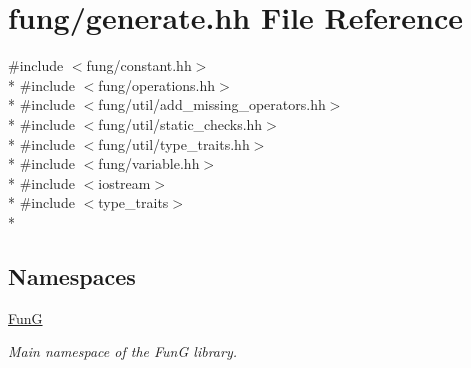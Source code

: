 \hypertarget{generate_8hh}{\section{fung/generate.hh File Reference}
\label{generate_8hh}
}
{\ttfamily \#include $<$fung/constant.\-hh$>$}\\*
{\ttfamily \#include $<$fung/operations.\-hh$>$}\\*
{\ttfamily \#include $<$fung/util/add\-\_\-missing\-\_\-operators.\-hh$>$}\\*
{\ttfamily \#include $<$fung/util/static\-\_\-checks.\-hh$>$}\\*
{\ttfamily \#include $<$fung/util/type\-\_\-traits.\-hh$>$}\\*
{\ttfamily \#include $<$fung/variable.\-hh$>$}\\*
{\ttfamily \#include $<$iostream$>$}\\*
{\ttfamily \#include $<$type\-\_\-traits$>$}\\*
\subsection*{Namespaces}
\begin{DoxyCompactItemize}
\item 
\hyperlink{namespaceFunG}{Fun\-G}
\begin{DoxyCompactList}\small\item\em Main namespace of the Fun\-G library. \end{DoxyCompactList}\end{DoxyCompactItemize}
